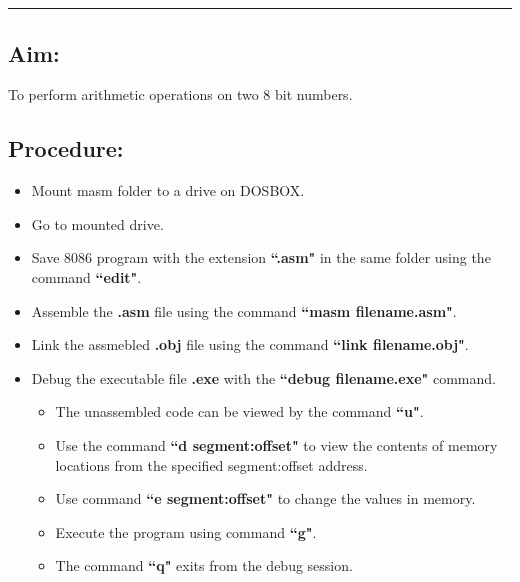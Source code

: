 \documentclass[12pt,a4paper]{article}
\begin{document}
\section*{}

\begin{table}[h]
\end{table}

\bigskip
\hrule
\begin{flushleft}
\subsection*{\textbf{Aim:}} 
To perform arithmetic operations on two 8 bit numbers.

\subsection*{\textbf{Procedure:}}
\begin{itemize}
    \item Mount masm folder to a drive on DOSBOX.
    \item Go to mounted drive.
    \item Save 8086 program with the extension \textbf{``.asm"} in the same folder using the command \textbf{``edit"}.
    \item Assemble the \textbf{.asm} file using the command \textbf{``masm filename.asm"}.
    \item Link the assmebled \textbf{.obj} file using the command \textbf{``link filename.obj"}.
    \item Debug the executable file \textbf{.exe} with the \textbf{``debug filename.exe"} command.
    \begin{itemize}
        \item The unassembled code can be viewed by the command \textbf{``u"}.
        \item Use the command \textbf{``d segment:offset"} to view the contents of memory locations from the specified segment:offset address.
        \item Use command \textbf{``e segment:offset"} to change the values in memory.
        \item Execute the program using command \textbf{``g"}.
        \item The command \textbf{``q"} exits from the debug session.
    \end{itemize}
\end{itemize}

\end{flushleft}
\end{document}
